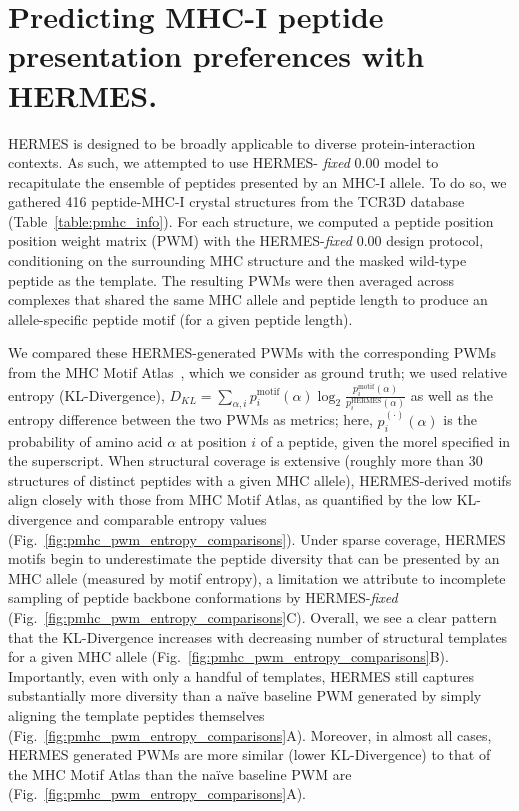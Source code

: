\section{Predicting MHC-I peptide presentation preferences with HERMES.} HERMES is designed to be
broadly applicable to diverse protein-interaction contexts. As such, we attempted to use HERMES-{\em
fixed} 0.00 model to recapitulate the ensemble of peptides presented by an MHC-I allele. To do so,
we gathered 416 peptide-MHC-I crystal structures from the TCR3D database~\cite{gowthaman_tcr3d_2019}
(Table~\ref{table:pmhc_info}). For each structure, we computed a peptide position position weight
matrix (PWM) with the HERMES-{\em fixed} 0.00 design protocol, conditioning on the surrounding MHC
structure and the masked wild-type peptide as the template. The resulting PWMs were then averaged
across complexes that shared the same MHC allele and peptide length to produce an allele-specific
peptide motif (for a given peptide length).

We compared these HERMES-generated PWMs with the corresponding PWMs from the MHC Motif
Atlas~\cite{Tadros2023-ij}, which we consider as ground truth; we used relative entropy
(KL-Divergence), $D_{KL}= \sum_{\alpha, i} p^{\text{motif}}_i(\alpha) \log_2
\frac{p^{\text{motif}}_i(\alpha)}{p^{\text{HERMES}}_i(\alpha)}$ as well as the entropy difference
between the two PWMs as metrics; here, $p_i^{(\cdot)}(\alpha)$ is the probability of amino acid
$\alpha$ at position $i$ of a peptide, given the morel specified in the superscript. When structural
coverage is extensive (roughly more than 30 structures of distinct peptides with a given MHC
allele), HERMES-derived motifs align closely with those from MHC Motif Atlas, as quantified by the
low KL-divergence and comparable entropy values (Fig.~\ref{fig:pmhc_pwm_entropy_comparisons}). Under
sparse coverage, HERMES motifs begin to underestimate the peptide diversity that can be presented by
an MHC allele (measured by motif entropy), a limitation we attribute to incomplete sampling of
peptide backbone conformations by HERMES-{\em fixed} (Fig.~\ref{fig:pmhc_pwm_entropy_comparisons}C).
Overall, we see a clear pattern that the KL-Divergence increases with decreasing number of
structural templates for a given MHC allele (Fig.~\ref{fig:pmhc_pwm_entropy_comparisons}B).
Importantly, even with only a handful of templates, HERMES still captures substantially more
diversity than a na\"ive baseline PWM generated by simply aligning the template peptides themselves
(Fig.~\ref{fig:pmhc_pwm_entropy_comparisons}A). Moreover, in almost all cases, HERMES generated PWMs
are more similar (lower KL-Divergence) to that of the MHC Motif Atlas than the na\"ive baseline PWM
are (Fig.~\ref{fig:pmhc_pwm_entropy_comparisons}A).
 
